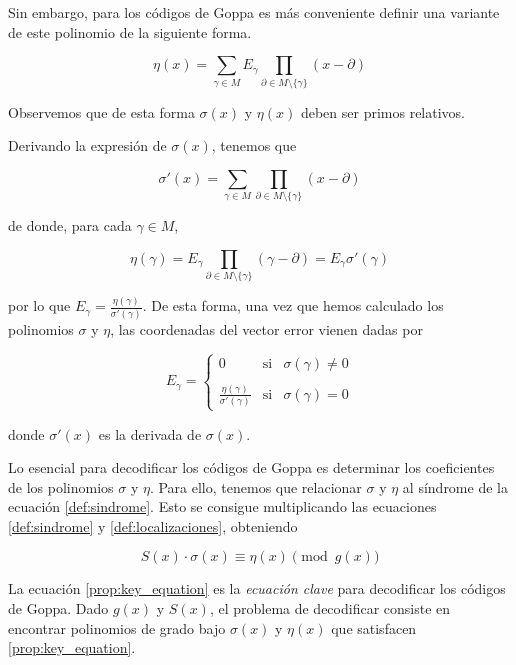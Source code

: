 Sin embargo, para los códigos de Goppa es más conveniente definir una variante de este polinomio de la siguiente forma.

\begin{equation}
    \label{def:eta}
    \eta (x) = \sum_{\gamma \in M} E_\gamma \prod_{\partial \in M \setminus \{ \gamma \} } (x - \partial)
\end{equation}

Observemos que de esta forma $\sigma(x)$ y $\eta(x)$ deben ser primos relativos.

Derivando la expresión de $\sigma(x)$, tenemos que 

\begin{equation}
    \label{def:localizaciones_derivada}
    \sigma'(x) = \sum_{\gamma \in M} \prod_{\partial \in M \setminus \{ \gamma \} } (x - \partial)
\end{equation}


de donde, para cada $\gamma \in M$,

$$\eta (\gamma) = E_\gamma \prod_{\partial \in M \setminus \{ \gamma \} } (\gamma - \partial) = E_\gamma \sigma'(\gamma)$$

por lo que $E_\gamma = \frac{\eta(\gamma)}{\sigma'(\gamma)}$. De esta forma, una vez que hemos calculado los polinomios $\sigma$ y $\eta$, las coordenadas del vector error vienen dadas por 

\[
    E_\gamma = \left\{ \begin{array}{lcc}
    0 &   \text{si}  & \sigma(\gamma) \neq 0 \\
    \\ \frac{\eta(\gamma)}{\sigma'(\gamma)} &  \text{si} & \sigma(\gamma) = 0
    \end{array}
    \right.
\]

donde $\sigma'(x)$ es la derivada de $\sigma(x)$.

Lo esencial para decodificar los códigos de Goppa es determinar los coeficientes de los polinomios $\sigma$ y $\eta$. Para ello, tenemos que relacionar $\sigma$ y $\eta$ al síndrome de la ecuación \ref{def:sindrome}. Esto se consigue multiplicando las ecuaciones \ref{def:sindrome} y \ref{def:localizaciones}, obteniendo

\begin{equation}
    \label{prop:key_equation}
    S(x) \cdot \sigma(x) \equiv \eta(x) \pmod{g(x)}
\end{equation}

La ecuación \ref{prop:key_equation} es la \emph{ecuación clave} para decodificar los códigos de Goppa. Dado $g(x)$ y $S(x)$, el problema de decodificar consiste en encontrar polinomios de grado bajo $\sigma(x)$ y $\eta(x)$ que satisfacen \ref{prop:key_equation}.


